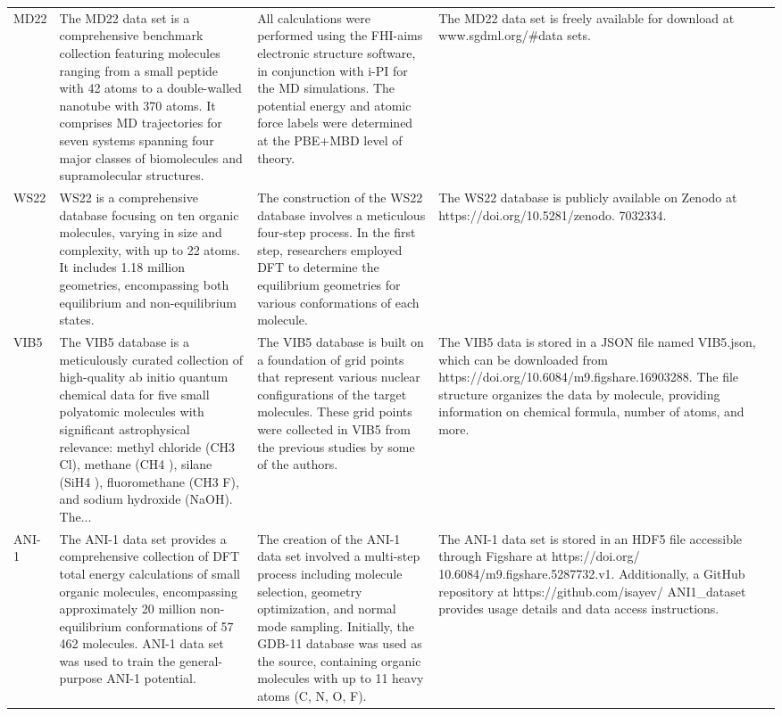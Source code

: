 \documentclass[12pt]{article}
\begin{document}
\begin{longtable}{p{}p{}p{}p{}}
MD22 \cite{ds22-21} & The MD22 data set is a comprehensive benchmark collection featuring molecules ranging from a small peptide with 42 atoms to a double-walled nanotube with 370 atoms. It comprises MD trajectories for seven systems spanning four major classes of biomolecules and supramolecular structures. & All calculations were performed using the FHI-aims electronic structure software, in conjunction with i-PI for the MD simulations. The potential energy and atomic force labels were determined at the PBE+MBD level of theory. & The MD22 data set is freely available for download at www.sgdml.org/\#data sets. \cite{ds22-130} \\
WS22 \cite{ds23-50} & WS22 is a comprehensive database focusing on ten organic molecules, varying in size and complexity, with up to 22 atoms. It includes 1.18 million geometries, encompassing both equilibrium and non-equilibrium states. & The construction of the WS22 database involves a meticulous four-step process. In the first step, researchers employed DFT to determine the equilibrium geometries for various conformations of each molecule. & The WS22 database is publicly available on Zenodo at https://doi.org/10.5281/zenodo. 7032334. \cite{ds23-133} \\
VIB5 \cite{ds24-48} & The VIB5 database is a meticulously curated collection of high-quality ab initio quantum chemical data for five small polyatomic molecules with significant astrophysical relevance: methyl chloride (CH3 Cl), methane (CH4 ), silane (SiH4 ), fluoromethane (CH3 F), and sodium hydroxide (NaOH). The... & The VIB5 database is built on a foundation of grid points that represent various nuclear configurations of the target molecules. These grid points were collected in VIB5 from the previous studies by some of the authors. & The VIB5 data is stored in a JSON file named VIB5.json, which can be downloaded from https://doi.org/10.6084/m9.figshare.16903288. The file structure organizes the data by molecule, providing information on chemical formula, number of atoms, and more. \cite{ds24-137} \\
ANI-1 \cite{ds25-7} & The ANI-1 data set provides a comprehensive collection of DFT total energy calculations of small organic molecules, encompassing approximately 20 million non-equilibrium conformations of 57 462 molecules. ANI-1 data set was used to train the general-purpose ANI-1 potential. & The creation of the ANI-1 data set involved a multi-step process including molecule selection, geometry optimization, and normal mode sampling. Initially, the GDB-11 database was used as the source, containing organic molecules with up to 11 heavy atoms (C, N, O, F). & The ANI-1 data set is stored in an HDF5 file accessible through Figshare at https://doi.org/ 10.6084/m9.figshare.5287732.v1. Additionally, a GitHub repository at https://github.com/isayev/ ANI1\_dataset provides usage details and data access instructions. \cite{ds25-139} \\

\end{longtable}
\end{document}
